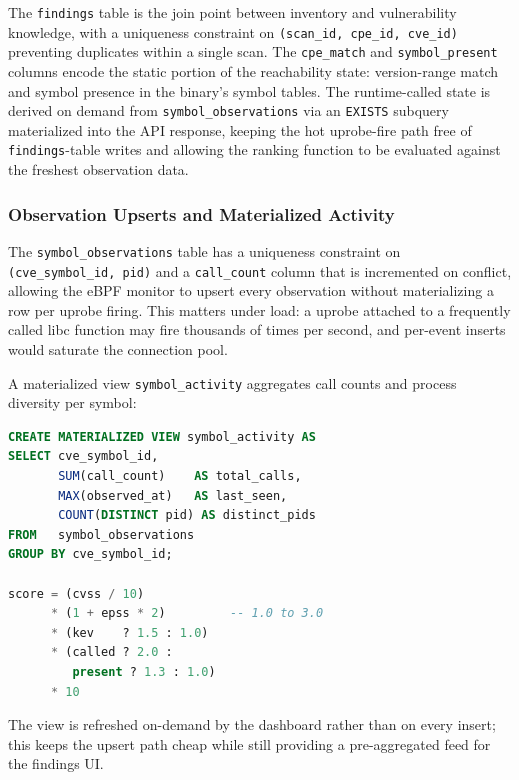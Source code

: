 \documentclass[conference]{IEEEtran}
\begin{document}
The \texttt{findings} table is the join point between inventory and vulnerability knowledge, with a uniqueness constraint on \texttt{(scan\_id, cpe\_id, cve\_id)} preventing duplicates within a single scan. The \texttt{cpe\_match} and \texttt{symbol\_present} columns encode the static portion of the reachability state: version-range match and symbol presence in the binary's symbol tables. The runtime-called state is derived on demand from \texttt{symbol\_observations} via an \texttt{EXISTS} subquery materialized into the API response, keeping the hot uprobe-fire path free of \texttt{findings}-table writes and allowing the ranking function to be evaluated against the freshest observation data.

\subsubsection{Observation Upserts and Materialized Activity}

The \texttt{symbol\_observations} table has a uniqueness constraint on \texttt{(cve\_symbol\_id, pid)} and a \texttt{call\_count} column that is incremented on conflict, allowing the eBPF monitor to upsert every observation without materializing a row per uprobe firing. This matters under load: a uprobe attached to a frequently called libc function may fire thousands of times per second, and per-event inserts would saturate the connection pool.

A materialized view \texttt{symbol\_activity} aggregates call counts and process diversity per symbol:

\begin{lstlisting}[language=SQL,numbers=none,
  caption={Definition of the \texttt{symbol\_activity} materialized
    view and \texttt{compute\_rank\_score} function. The \texttt{called}
    and \texttt{present} arguments are computed at query time from
    \texttt{symbol\_observations} and \texttt{cve\_symbols.validated}
    respectively.},
  label={lst:symbol-activity}]
CREATE MATERIALIZED VIEW symbol_activity AS
SELECT cve_symbol_id,
       SUM(call_count)    AS total_calls,
       MAX(observed_at)   AS last_seen,
       COUNT(DISTINCT pid) AS distinct_pids
FROM   symbol_observations
GROUP BY cve_symbol_id;

score = (cvss / 10)
      * (1 + epss * 2)         -- 1.0 to 3.0
      * (kev    ? 1.5 : 1.0)
      * (called ? 2.0 :
         present ? 1.3 : 1.0)
      * 10
\end{lstlisting}

The view is refreshed on-demand by the dashboard rather than on every insert; this keeps the upsert path cheap while still providing a pre-aggregated feed for the findings UI.
\end{document}
